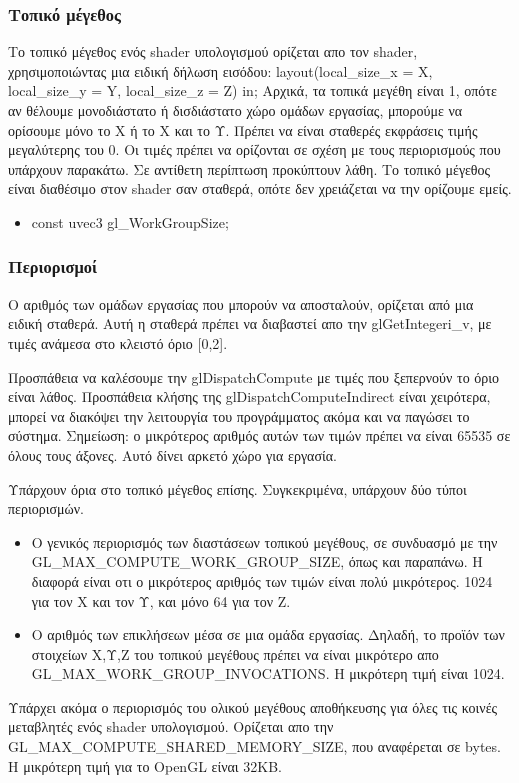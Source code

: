 \subsubsection{Τοπικό μέγεθος}
Το τοπικό μέγεθος ενός shader υπολογισμού ορίζεται απο τον shader, χρησιμοποιώντας μια ειδική δήλωση εισόδου: 
layout(local\_size\_x = X, local\_size\_y = Y, local\_size\_z = Z) in;
Αρχικά, τα τοπικά μεγέθη είναι 1, οπότε αν θέλουμε μονοδιάστατο ή δισδιάστατο χώρο ομάδων εργασίας, μπορούμε να ορίσουμε μόνο το Χ ή το Χ και το Υ. Πρέπει να είναι σταθερές εκφράσεις τιμής μεγαλύτερης του 0. Οι τιμές πρέπει να ορίζονται σε σχέση με τους περιορισμούς που υπάρχουν παρακάτω. Σε αντίθετη περίπτωση προκύπτουν λάθη. Το τοπικό μέγεθος είναι διαθέσιμο στον shader σαν σταθερά, οπότε δεν χρειάζεται να την ορίζουμε εμείς.
\begin{itemize}
\item const uvec3 gl\_WorkGroupSize;
\end{itemize}
\subsubsection{Περιορισμοί}
Ο αριθμός των ομάδων εργασίας που μπορούν να αποσταλούν, ορίζεται από μια ειδική σταθερά. Αυτή η σταθερά πρέπει να διαβαστεί απο την glGetIntegeri\_v, με τιμές ανάμεσα στο κλειστό όριο [0,2]. 

Προσπάθεια να καλέσουμε την glDispatchCompute με τιμές που ξεπερνούν το όριο είναι λάθος. Προσπάθεια κλήσης της glDispatchComputeIndirect είναι χειρότερα, μπορεί να διακόψει την λειτουργία του προγράμματος ακόμα και να παγώσει το σύστημα. Σημείωση: ο μικρότερος αριθμός αυτών των τιμών πρέπει να είναι 65535 σε όλους τους άξονες. Αυτό δίνει αρκετό χώρο για εργασία. 

Υπάρχουν όρια στο τοπικό μέγεθος επίσης. Συγκεκριμένα, υπάρχουν δύο τύποι περιορισμών. 
\begin{itemize}
\item Ο γενικός περιορισμός των διαστάσεων τοπικού μεγέθους, σε συνδυασμό με την GL\_MAX\_COMPUTE\_WORK\_GROUP\_SIZE, όπως και παραπάνω. Η διαφορά είναι οτι ο μικρότερος αριθμός των τιμών είναι πολύ μικρότερος. 1024 για τον Χ και τον Υ, και μόνο 64 για τον Ζ.
\item Ο αριθμός των επικλήσεων μέσα σε μια ομάδα εργασίας. Δηλαδή, το προϊόν των στοιχείων Χ,Υ,Ζ του τοπικού μεγέθους πρέπει να είναι μικρότερο απο GL\_MAX\_WORK\_GROUP\_INVOCATIONS. Η μικρότερη τιμή είναι 1024.
\end{itemize}
Υπάρχει ακόμα ο περιορισμός του ολικού μεγέθους αποθήκευσης για όλες τις κοινές μεταβλητές ενός shader υπολογισμού. Ορίζεται απο την GL\_MAX\_COMPUTE\_SHARED\_MEMORY\_SIZE, που αναφέρεται σε bytes. Η μικρότερη τιμή για το OpenGL είναι 32KB.
